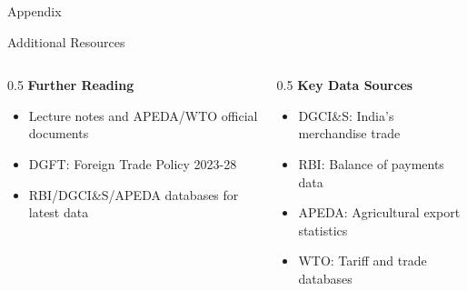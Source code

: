 \documentclass[
  ignorenonframetext,
  aspectratio=169,
]{beamer}
\makeatletter
\providecommand{\tightlist}{%
  \setlength{\itemsep}{0pt}\setlength{\parskip}{0pt}}
\let\quarto@originallabel\label
\DeclareRobustCommand*{\label}[1]{\quarto@originallabel{#1}}
\makeatother
\begin{document}
\begin{frame}{Appendix}
\label{appendix}
\begin{block}{Additional Resources}
\label{additional-resources}
\begin{columns}[T]
\begin{column}{0.5\linewidth}
\textbf{Further Reading}

\begin{itemize}
\tightlist
\item
  Lecture notes and APEDA/WTO official documents
\item
  DGFT: Foreign Trade Policy 2023-28
\item
  RBI/DGCI\&S/APEDA databases for latest data
\end{itemize}
\end{column}

\begin{column}{0.5\linewidth}
\textbf{Key Data Sources}

\begin{itemize}
\tightlist
\item
  DGCI\&S: India's merchandise trade
\item
  RBI: Balance of payments data\\
\item
  APEDA: Agricultural export statistics
\item
  WTO: Tariff and trade databases
\end{itemize}
\end{column}
\end{columns}
\end{block}
\end{frame}
\end{document}
